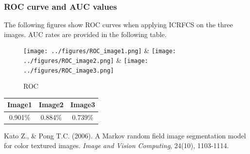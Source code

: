 \documentclass[english]{article}\usepackage{graphicx, color}
\numberwithin{equation}{section}
\numberwithin{figure}{section}
\begin{document}
\subsubsection{ROC curve and AUC values}
The following figures show ROC curves when applying ICRFCS on the three images. AUC rates are provided in the following table.
\begin{figure}[!h]
  \begin{center}
    \texttt{[image: ../figures/ROC\_image1.png]} & 
    \texttt{[image: ../figures/ROC\_image2.png]} &
    \texttt{[image: ../figures/ROC\_image3.png]} \\
  \end{center}
  \caption{ROC}
  \label{fig:ROC}
\end{figure}

\begin{center}
 \begin{tabular}{||c c c||} 
 \hline
 Image1 & Image2 & Image3 \\ [0.5ex] 
 \hline\hline
 0.901\% & 0.884\% & 0.739\% \\ [1ex] 
 \hline
\end{tabular}
\end{center}

\begin{thebibliography}{9}

  Kato Z., \& Pong T.C. (2006).
  A Markov random field image segmentation model for color textured images.
  \emph{Image and Vision Computing}, 24(10), 1103-1114.

\end{thebibliography}
\end{document}
